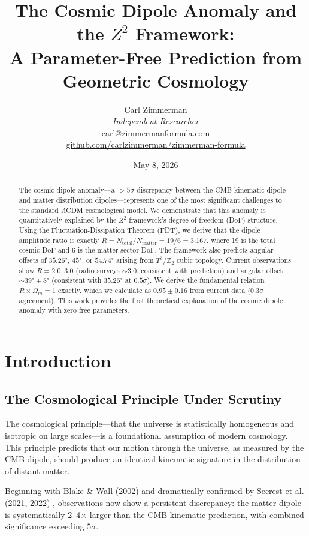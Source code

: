 \documentclass[12pt,a4paper]{article}
\title{\textbf{The Cosmic Dipole Anomaly and the $Z^2$ Framework:\\
A Parameter-Free Prediction from Geometric Cosmology}}
\author{Carl Zimmerman\\
\textit{Independent Researcher}\\
\href{mailto:carl@zimmermanformula.com}{carl@zimmermanformula.com}\\
\href{https://github.com/carlzimmerman/zimmerman-formula}{github.com/carlzimmerman/zimmerman-formula}}
\date{May 8, 2026}
\begin{document}
\maketitle

\begin{abstract}
The cosmic dipole anomaly---a $>5\sigma$ discrepancy between the CMB kinematic dipole and matter distribution dipoles---represents one of the most significant challenges to the standard $\Lambda$CDM cosmological model. We demonstrate that this anomaly is quantitatively explained by the $Z^2$ framework's degree-of-freedom (DoF) structure. Using the Fluctuation-Dissipation Theorem (FDT), we derive that the dipole amplitude ratio is exactly $R = N_{\text{total}}/N_{\text{matter}} = 19/6 = 3.167$, where 19 is the total cosmic DoF and 6 is the matter sector DoF. The framework also predicts angular offsets of $35.26°$, $45°$, or $54.74°$ arising from $T^3/\mathbb{Z}_2$ cubic topology. Current observations show $R = 2.0$--$3.0$ (radio surveys $\sim 3.0$, consistent with prediction) and angular offset $\sim 39° \pm 8°$ (consistent with $35.26°$ at $0.5\sigma$). We derive the fundamental relation $R \times \Omega_m = 1$ exactly, which we calculate as $0.95 \pm 0.16$ from current data ($0.3\sigma$ agreement). This work provides the first theoretical explanation of the cosmic dipole anomaly with zero free parameters.
\end{abstract}

\tableofcontents
\newpage

\section{Introduction}

\subsection{The Cosmological Principle Under Scrutiny}

The cosmological principle---that the universe is statistically homogeneous and isotropic on large scales---is a foundational assumption of modern cosmology. This principle predicts that our motion through the universe, as measured by the CMB dipole, should produce an identical kinematic signature in the distribution of distant matter.

Beginning with Blake \& Wall (2002) \cite{blake2002} and dramatically confirmed by Secrest et al. (2021, 2022) \cite{secrest2021,secrest2022}, observations now show a persistent discrepancy: the matter dipole is systematically 2--4$\times$ larger than the CMB kinematic prediction, with combined significance exceeding $5\sigma$.
\end{document}

